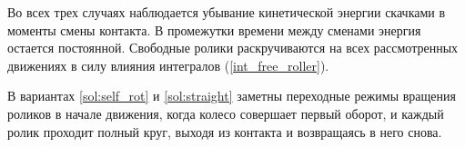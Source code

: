 

Во всех трех случаях наблюдается убывание кинетической энергии скачками в моменты смены контакта. В промежутки времени между сменами энергия остается постоянной.
Свободные ролики раскручиваются на всех рассмотренных движениях в силу влияния интегралов (\ref{int_free_roller}).

В вариантах \ref{sol:self_rot} и \ref{sol:straight} заметны переходные режимы вращения роликов в начале движения, когда колесо совершает первый оборот, и каждый ролик проходит полный круг, выходя из контакта и возвращаясь в него снова.

